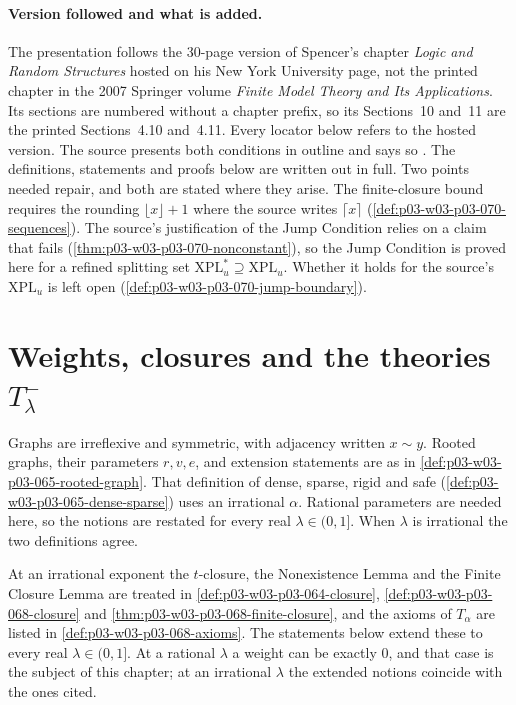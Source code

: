 \paragraph{Version followed and what is added.}
The presentation follows the 30-page version of Spencer's chapter
\emph{Logic and Random Structures} hosted on his New York University page,
not the printed chapter in the 2007 Springer volume \emph{Finite Model Theory
and Its Applications}.  Its sections are numbered without a chapter prefix,
so its Sections~10 and~11 are the printed Sections~4.10 and~4.11.  Every
locator below refers to the hosted version.  The source presents both
conditions in outline and says so \cite[p.~21]{Spencer2007LogicRandomStructuresAuthor}.
The definitions, statements and proofs below are written out in full.  Two
points needed repair, and both are stated where they arise.  The
finite-closure bound requires the rounding \(\lfloor x\rfloor+1\) where the
source writes \(\lceil x\rceil\) (\cref{def:p03-w03-p03-070-sequences}).
The source's justification of the Jump Condition relies on a claim that fails
(\cref{thm:p03-w03-p03-070-nonconstant}), so the Jump Condition is proved
here for a refined splitting set \(\mathrm{XPL}^\ast_u\supseteq\mathrm{XPL}_u\).
Whether it holds for the source's \(\mathrm{XPL}_u\) is left open
(\cref{def:p03-w03-p03-070-jump-boundary}).

\section{Weights, closures and the theories \texorpdfstring{\(T^-_\lambda\)}{T-lambda}}
\label{sec:p03-w03-p03-070-closures}

Graphs are irreflexive and symmetric, with adjacency written \(x\sim y\).
Rooted graphs, their parameters \(r,v,e\), and extension statements are as
in \cref{def:p03-w03-p03-065-rooted-graph}.  That definition of dense,
sparse, rigid and safe (\cref{def:p03-w03-p03-065-dense-sparse}) uses an
irrational \(\alpha\).  Rational parameters are needed here, so the notions
are restated for every real \(\lambda\in(0,1]\).  When \(\lambda\) is
irrational the two definitions agree.

At an irrational exponent the \(t\)-closure, the Nonexistence Lemma and the
Finite Closure Lemma are treated in \cref{def:p03-w03-p03-064-closure},
\cref{def:p03-w03-p03-068-closure} and
\cref{thm:p03-w03-p03-068-finite-closure}, and the axioms of \(T_\alpha\)
are listed in \cref{def:p03-w03-p03-068-axioms}.  The statements below
extend these to every real \(\lambda\in(0,1]\).  At a rational \(\lambda\) a
weight can be exactly \(0\), and that case is the subject of this chapter;
at an irrational \(\lambda\) the extended notions coincide with the ones
cited.

